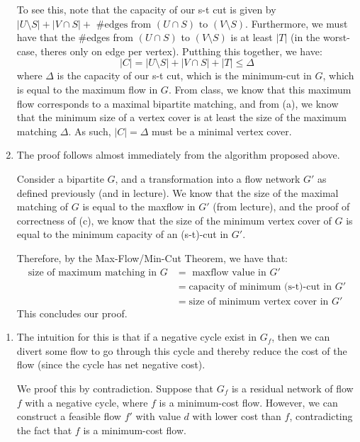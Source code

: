 \documentclass[12pt]{exam}
\newcommand{\Q}[1]{\question{\large{\textbf{#1}}}}
\begin{document}
\begin{questions}
\begin{solution}
\begin{enumerate}[label=(\alph*)]
      To see this, note that the capacity of our s-t cut is given by $|U \setminus S| + |V \cap S| + \text{ \#edges from $(U \cap S)$ to $(V \setminus S)$}$. Furthermore, we must have that the \#edges from $(U \cap S)$ to $(V \setminus S)$ is at least $|T|$ (in the worst-case, theres only on edge per vertex). Putthing this together, we have:
      \[
        |C| = |U \setminus S| + |V \cap S| + |T| \leq \Delta
      \]
      where $\Delta$ is the capacity of our s-t cut, which is the minimum-cut in $G$, which is equal to the maximum flow in $G$. From class, we know that this maximum flow corresponds to a maximal bipartite matching, and from (a), we know that the minimum size of a vertex cover is at least the size of the maximum matching $\Delta$. As such, $|C| = \Delta$ must be a minimal vertex cover.
     \item
      The proof follows almost immediately from the algorithm proposed above. 

      Consider a bipartite $G$, and a transformation into a flow network $G'$ as defined previously (and in lecture). We know that the size of the maximal matching of $G$ is equal to the maxflow in $G'$ (from lecture), and the proof of correctness of (c), we know that the size of the minimum vertex cover of $G$ is equal to the minimum capacity of an (s-t)-cut in $G'$.

      Therefore, by the Max-Flow/Min-Cut Theorem, we have that:
      \begin{align*}
        \text{size of maximum matching in $G$} &= \text{ maxflow value in $G'$ }  \\
        &= \text{capacity of minimum (s-t)-cut in $G'$} \tag{Max-Flow/Min-Cut Theorem} \\
        &= \text{size of minimum vertex cover in $G'$} \tag{By (c)}
      \end{align*}
      This concludes our proof.
  \end{enumerate}
\end{solution}

\newpage
\Q{Problem 5}
\begin{solution}
  \begin{enumerate}[label=(\alph*)]
    \item
      The intuition for this is that if a negative cycle exist in $G_f$, then we can divert some flow to go through this cycle and thereby reduce the cost of the flow (since the cycle has net negative cost).

      We proof this by contradiction. Suppose that $G_f$ is a residual network of flow $f$ with a negative cycle, where $f$ is a minimum-cost flow. However, we can construct a feasible flow $f'$ with value $d$ with lower cost than $f$, contradicting the fact that $f$ is a minimum-cost flow.


\end{enumerate}
\end{solution}
\end{questions}
\end{document}
